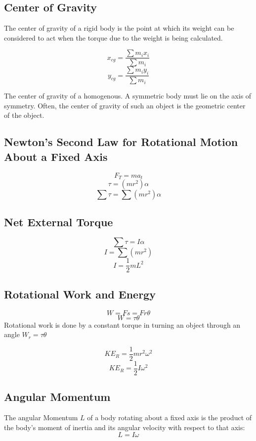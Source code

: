 
\subsection{Center of Gravity}
The center of gravity of a rigid body is the point at which its weight can be considered to act when the torque due to the weight is being calculated. 

\[x_{cg}=\frac{\sum m_ix_i}{\sum m_i}\]
\[y_{cg}=\frac{\sum m_iy_i}{\sum m_i}\]

The center of gravity of a homogenous. A symmetric body must lie on the axis of symmetry. Often, the center of gravity of such an object is the geometric center of the object. 

\subsection{Newton’s Second Law for Rotational Motion About a Fixed Axis}
\[F_T=ma_t\]
\[\tau=(mr^2)\alpha\]
\[\sum\tau=\sum(mr^2)\alpha\]

\subsection{Net External Torque}
\[\sum\tau=I\alpha\]
\[I=\sum(mr^2)\]
\[I=\frac{1}{2}mL^2\]

\subsection{Rotational Work and Energy}
\[W=Fs=Fr\theta\]
\[W=\tau\theta\]
Rotational work is done by a constant torque in turning an object through an angle $W_r=\tau\theta$

\[KE_R=\frac{1}{2}mr^2\omega^2\]
\[KE_R=\frac{1}{2}I\omega^2\]

\subsection{Angular Momentum}
The angular Momentum $L$ of a body rotating about a fixed axis is the product of the body's moment of inertia and its angular velocity with respect to that axis: \[L=I\omega\]

